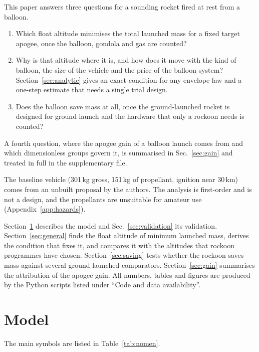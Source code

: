 \documentclass[11pt,a4paper]{article}
\begin{document}
This paper answers three questions for a sounding rocket fired at rest from a balloon.
\begin{enumerate}
\item Which float altitude minimises the total launched mass for a fixed target apogee, once the balloon, gondola and gas are counted?
\item Why is that altitude where it is, and how does it move with the kind of balloon, the size of the vehicle and the price of the balloon system? Section~\ref{sec:analytic} gives an exact condition for any envelope law and a one-step estimate that needs a single trial design.
\item Does the balloon save mass at all, once the ground-launched rocket is designed for ground launch and the hardware that only a rockoon needs is counted?
\end{enumerate}
A fourth question, where the apogee gain of a balloon launch comes from and which dimensionless groups govern it, is summarised in Sec.~\ref{sec:gain} and treated in full in the supplementary file.

The baseline vehicle (301\,kg gross, 151\,kg of propellant, ignition near 30\,km) comes from an unbuilt proposal by the authors. The analysis is first-order and is not a design, and the propellants are unsuitable for amateur use (Appendix~\ref{app:hazards}).

Section~\ref{sec:model} describes the model and Sec.~\ref{sec:validation} its validation. Section~\ref{sec:general} finds the float altitude of minimum launched mass, derives the condition that fixes it, and compares it with the altitudes that rockoon programmes have chosen. Section~\ref{sec:saving} tests whether the rockoon saves mass against several ground-launched comparators. Section~\ref{sec:gain} summarises the attribution of the apogee gain. All numbers, tables and figures are produced by the Python scripts listed under ``Code and data availability''.

\section{Model}
\label{sec:model}

The main symbols are listed in Table~\ref{tab:nomen}.
\end{document}
